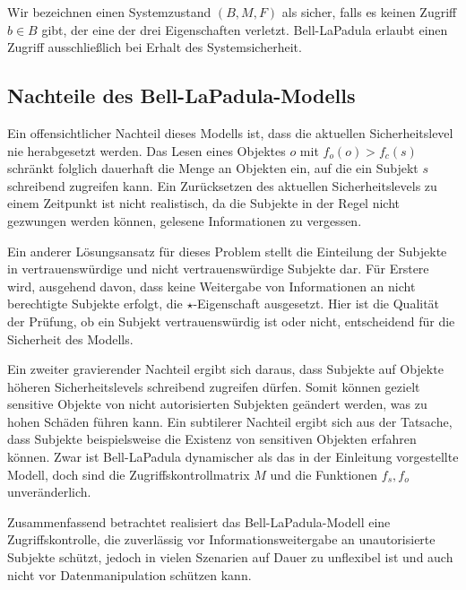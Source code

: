 Wir bezeichnen einen Systemzustand \((B, M, F)\) als sicher, falls es keinen Zugriff \(b \in B\) gibt, der eine der drei Eigenschaften verletzt. Bell-LaPadula erlaubt einen Zugriff ausschließlich bei Erhalt des Systemsicherheit.

\subsection{Nachteile des Bell-LaPadula-Modells}
Ein offensichtlicher Nachteil dieses Modells ist, dass die aktuellen Sicherheitslevel nie herabgesetzt werden. Das Lesen eines Objektes \(o\) mit \(f_o(o) > f_c(s)\) schränkt folglich dauerhaft die Menge an Objekten ein, auf die ein Subjekt \(s\) schreibend zugreifen kann. Ein Zurücksetzen des aktuellen Sicherheitslevels zu einem Zeitpunkt ist nicht realistisch, da die Subjekte in der Regel nicht gezwungen werden können, gelesene Informationen zu vergessen.

Ein anderer Lösungsansatz für dieses Problem stellt die Einteilung der Subjekte in vertrauenswürdige und nicht vertrauenswürdige  Subjekte dar. Für Erstere wird, ausgehend davon, dass keine Weitergabe von Informationen an nicht berechtigte Subjekte erfolgt, die \(\star\)-Eigenschaft ausgesetzt. Hier ist die Qualität der Prüfung, ob ein Subjekt vertrauenswürdig ist oder nicht, entscheidend für die Sicherheit des Modells. 

Ein zweiter gravierender Nachteil ergibt sich daraus, dass Subjekte auf Objekte höheren Sicherheitslevels schreibend zugreifen dürfen. Somit können gezielt sensitive Objekte von nicht autorisierten Subjekten geändert werden, was zu hohen Schäden führen kann.
Ein subtilerer Nachteil ergibt sich aus der Tatsache, dass Subjekte beispielsweise die Existenz von sensitiven Objekten erfahren können. %
Zwar ist Bell-LaPadula dynamischer als das in der Einleitung vorgestellte Modell, doch sind die Zugriffskontrollmatrix \(M\) und die Funktionen \(f_s, f_o\) unveränderlich. 

Zusammenfassend betrachtet realisiert das Bell-LaPadula-Modell eine Zugriffskontrolle, die zuverlässig vor Informationsweitergabe an unautorisierte Subjekte schützt, jedoch in vielen Szenarien auf Dauer zu unflexibel ist und auch nicht vor Datenmanipulation schützen kann.

